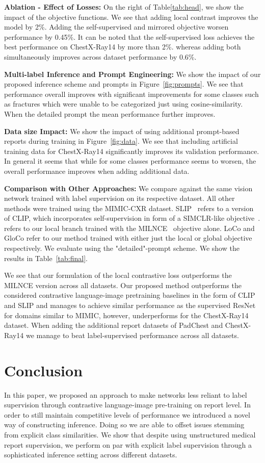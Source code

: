 \documentclass[runningheads]{llncs}
\begin{document}
 
\noindent\textbf{Ablation - Effect of Losses:}
On the right of Table\ref{tab:head}, we show the impact of the objective functions. We see that adding local contrast improves the model by 2\%. Adding the self-supervised and mirrored objective worsen performance by 0.45\%. It can be noted that the self-supervised loss achieves the best performance on ChestX-Ray14 by more than 2\%.
 whereas adding both simultaneously improves across dataset performance by 0.6\%. 

\noindent\textbf{Multi-label Inference and Prompt Engineering:} We show the impact of our proposed inference scheme and prompts in Figure~\ref{fig:prompts}. We see that performance overall improves with significant improvements for some classes such as fractures which were unable to be categorized just using cosine-similarity. When the detailed prompt the mean performance further improves.

\noindent\textbf{Data size Impact: }
 We show the impact of using additional prompt-based reports during training  in Figure~\ref{fig:data}. We see that including artificial training data for ChestX-Ray14 significantly improves its validation performance.  In general it seems that while for some classes performance seems to worsen, the overall performance improves when adding additional data.


\noindent\textbf{Comparison with Other Approaches: }
We compare against the same vision network trained with label supervision on its respective dataset. All other methods were trained using the MIMIC-CXR dataset. SLIP~\cite{mu2021slip} refers to a version of CLIP, which incorporates self-supervision in form of a SIMCLR-like objective~\cite{chen2020simple}.  refers to our local branch trained with the MILNCE~\cite{miech2020end} objective alone. LoCo and GloCo refer to our method trained with either just the local or global objective respectively. We evaluate using the "detailed"-prompt scheme.  We show the results in Table~\ref{tab:final}. 

We see that our formulation of the local contrastive loss outperforms the MILNCE version across all datasets. Our proposed method outperforms the considered contrastive language-image pretraining baselines in the form of CLIP and SLIP and manages to achieve similar performance as the supervised ResNet for domains similar to MIMIC, however, underperforms for the ChestX-Ray14 dataset. When adding the additional report datasets of PadChest and ChestX-Ray14 we manage to beat label-supervised performance across all datasets.
 \section{Conclusion}
In this paper, we proposed an approach to make networks less reliant to label supervision through contrastive language-image pre-training on report level. In order to still maintain competitive levels of performance we introduced a novel way of constructing inference. Doing so we are able to offset issues stemming from explicit class similarities. 
We show that despite using unstructured medical report supervision, we perform on par with explicit label supervision through a sophisticated inference setting across different datasets. 
\end{document}
